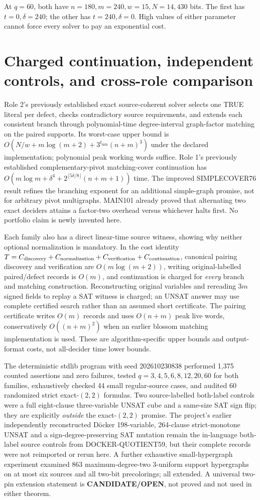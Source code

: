 \documentclass[11pt]{article}
\begin{document}
At $q=60$, both have $n=180,m=240,w=15,N=14{,}430$ bits. The first has $t=0,\delta=240$; the other has $t=240,\delta=0$. High values of either parameter cannot force every solver to pay an exponential cost.

\section{Charged continuation, independent controls, and cross-role comparison}
Role 2's previously established exact source-coherent solver selects one TRUE literal per defect, checks contradictory source requirements, and extends each consistent branch through polynomial-time degree-interval graph-factor matching on the paired supports. Its worst-case upper bound is $O(N/w+m\log(m+2)+3^{t_{\min}}(n+m)^3)$ under the declared implementation; polynomial peak working words suffice. Role 1's previously established complementary-pivot matching-cover continuation has $O(m\log m+\delta^4+2^{\lfloor5\delta/8\rfloor}(n+m+1))$ time. The improved SIMPLECOVER76 result refines the branching exponent for an additional simple-graph promise, not for arbitrary pivot multigraphs. MAIN101 already proved that alternating two exact deciders attains a factor-two overhead versus whichever halts first. No portfolio claim is newly invented here.

Each family also has a direct linear-time source witness, showing why neither optional normalization is mandatory. In the cost identity $T=C_{\rm discovery}+C_{\rm normalization}+C_{\rm verification}+C_{\rm continuation}$, canonical pairing discovery and verification are $O(m\log(m+2))$, writing original-labelled paired/defect records is $O(m)$, and continuation is charged for \emph{every} branch and matching construction. Reconstructing original variables and rereading $3m$ signed fields to replay a SAT witness is charged; an UNSAT answer may use complete certified search rather than an assumed short certificate. The pairing certificate writes $O(m)$ records and uses $O(n+m)$ peak live words, conservatively $O((n+m)^2)$ when an earlier blossom matching implementation is used. These are algorithm-specific upper bounds and output-format costs, not all-decider time lower bounds.

The deterministic stdlib program with seed 202610230838 performed 1,375 counted assertions and zero failures, tested $q=3,4,5,6,8,12,20,60$ for both families, exhaustively checked 44 small regular-source cases, and audited 60 randomized strict exact-$(2,2)$ formulas. Two source-labelled both-label controls were a full eight-clause three-variable UNSAT cube and a same-size SAT sign flip; they are explicitly \emph{outside} the exact-$(2,2)$ promise. The project's earlier independently reconstructed D\"ocker 198-variable, 264-clause strict-monotone UNSAT and a sign-degree-preserving SAT mutation remain the in-language both-label source controls from DOCKER-QUOTIENT59, but their complete records were not reimported or rerun here. A further exhaustive small-hypergraph experiment examined 863 maximum-degree-two 3-uniform support hypergraphs on at most six sources and all two-bit precolorings; all extended. A universal two-pin extension statement is \textbf{CANDIDATE/OPEN}, not proved and not used in either theorem.
\end{document}
